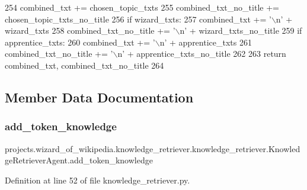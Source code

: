 \begin{DoxyCode}
254             combined\_txt += chosen\_topic\_txts
255             combined\_txt\_no\_title += chosen\_topic\_txts\_no\_title
256         \textcolor{keywordflow}{if} wizard\_txts:
257             combined\_txt += \textcolor{stringliteral}{'\(\backslash\)n'} + wizard\_txts
258             combined\_txt\_no\_title += \textcolor{stringliteral}{'\(\backslash\)n'} + wizard\_txts\_no\_title
259         \textcolor{keywordflow}{if} apprentice\_txts:
260             combined\_txt += \textcolor{stringliteral}{'\(\backslash\)n'} + apprentice\_txts
261             combined\_txt\_no\_title += \textcolor{stringliteral}{'\(\backslash\)n'} + apprentice\_txts\_no\_title
262 
263         \textcolor{keywordflow}{return} combined\_txt, combined\_txt\_no\_title
264 
\end{DoxyCode}


\subsection{Member Data Documentation}
\mbox{\label{classprojects_1_1wizard__of__wikipedia_1_1knowledge__retriever_1_1knowledge__retriever_1_1KnowledgeRetrieverAgent_a844234360c751d35f7cbd55f6e40eb88}} 
\subsubsection{\texorpdfstring{add\+\_\+token\+\_\+knowledge}{add\_token\_knowledge}}
{\footnotesize\ttfamily projects.\+wizard\+\_\+of\+\_\+wikipedia.\+knowledge\+\_\+retriever.\+knowledge\+\_\+retriever.\+Knowledge\+Retriever\+Agent.\+add\+\_\+token\+\_\+knowledge}



Definition at line 52 of file knowledge\+\_\+retriever.\+py.

